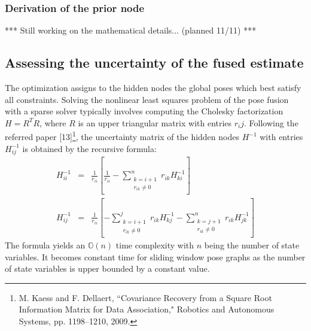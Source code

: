 \documentclass[letterpaper,10pt]{article}
\begin{document}
\subsubsection{Derivation of the prior node}
***
Still working on the mathematical details... (planned 11/11)
***

\subsection{Assessing the uncertainty of the fused estimate}

The optimization assigns to the hidden nodes the global poses which best satisfy all constraints. Solving the nonlinear least squares problem of the pose fusion with a sparse solver typically involves computing the Cholesky factorization $H=R^TR$, where $R$ is an upper triangular matrix with entries $r_ij$. Following the referred paper [13]\footnote{M. Kaess and F. Dellaert, ``Covariance Recovery from a Square Root Information Matrix for Data Association," Robotics and Autonomous Systems, pp. 1198–1210, 2009.}, the uncertainty matrix of the hidden nodes $H^{-1}$ with entries $H_{ij}^{-1}$ is obtained by the recursive formula:
\begin{equation}
\begin{array}{rcl}
H_{ii}^{-1} & = & \frac{1}{r_{ii}}\left[\frac{1}{r_{ii}}-\sum_{\begin{array}{c}
	k=i+1 \\
	r_{ik} \neq 0 \\
	\end{array}}^{n}{r_{ik}H_{ki}^{-1}}\right] \\
H_{ij}^{-1} & = & \frac{1}{r_{ii}}\left[-\sum_{\begin{array}{c}
	k=i+1 \\
	r_{ik} \neq 0 \\
	\end{array}}^{j}{r_{ik}H_{kj}^{-1}}-\sum_{\begin{array}{c}
	k=j+1 \\
	r_{ik} \neq 0 \\
	\end{array}}^{n}{r_{ik}H_{jk}^{-1}}\right]
\end{array}
\end{equation}
The formula yields an $\mathbb{O}(n)$ time complexity with $n$ being the number of state variables. It becomes constant time for sliding window pose graphs as the number of state variables is upper bounded by a constant value.
\end{document}
